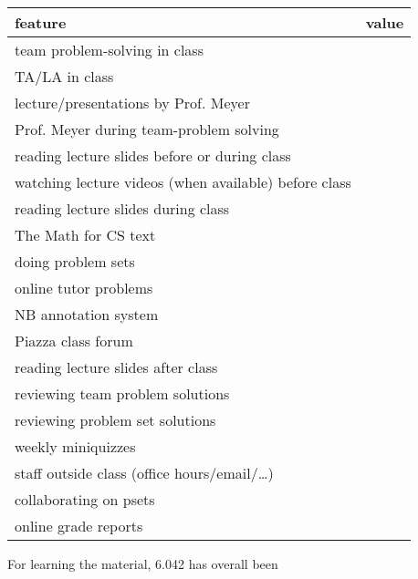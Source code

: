 \documentclass[handout]{mcs}
\begin{document}
\begin{center}

\begin{tabular}{| l | c |}
\hline
\hspace{1in} feature &  value\\  %
\hline  \hline
   team problem-solving in class  & \\   \hline
   TA/LA in class        & \\  \hline
   lecture/presentations by Prof. Meyer  & \\  \hline
   Prof. Meyer during team-problem solving &\\ \hline
   reading lecture slides before or during class    & \\  \hline
   watching lecture videos (when available) before class    & \\  \hline
   reading lecture slides during class    & \\  \hline
   The Math for CS text          & \\  \hline
   doing problem sets          & \\  \hline
   online tutor problems & \\  \hline
   NB annotation system  & \\  \hline
   Piazza class forum  & \\  \hline
   reading lecture slides after class     & \\  \hline
   reviewing team problem solutions       & \\  \hline
   reviewing problem set solutions & \\  \hline
   weekly miniquizzes                   & \\  \hline
   staff outside class (office hours/email/\dots) & \\  \hline
   collaborating on psets                 & \\  \hline
   online grade reports                   & \\  \hline
\end{tabular}
\end{center}

For learning the material, 6.042 has overall been  \hfill \brule{0.5in}
\end{document}
